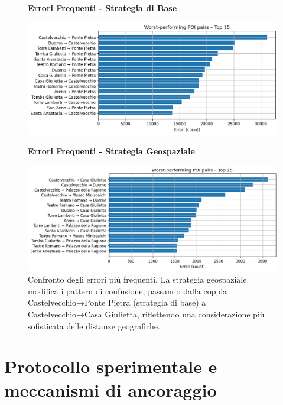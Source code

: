 \begin{figure}[htbp]
\centering
\begin{minipage}{0.48\textwidth}
\centering
\textbf{Errori Frequenti - Strategia di Base}\par
\vspace{0.3em}
\includegraphics[width=\textwidth]{../../img/llama3.1_8b/no_SPACE-GEO_n-1_come_current_POI/worst_performing_pairs.png}
\end{minipage}
\hfill
\begin{minipage}{0.48\textwidth}
\centering
\textbf{Errori Frequenti - Strategia Geospaziale}\par
\vspace{0.3em}
\includegraphics[width=\textwidth]{../../img/llama3.1_8b/SPACE-GEO_n-1_come_current_POI/Worst_performing_POI_pairs.png}
\end{minipage}
\caption{Confronto degli errori più frequenti. La strategia geospaziale modifica i pattern di confusione, passando dalla coppia Castelvecchio→Ponte Pietra (strategia di base) a Castelvecchio→Casa Giulietta, riflettendo una considerazione più sofisticata delle distanze geografiche.}
\label{fig:errors_comparison}
\end{figure}

\section{Protocollo sperimentale e meccanismi di ancoraggio}

